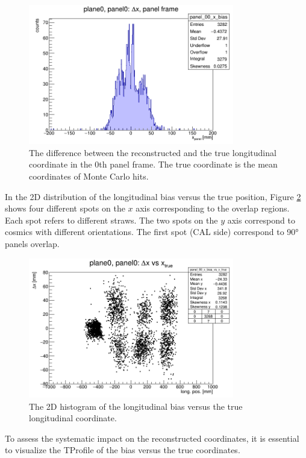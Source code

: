 \begin{figure}[!h]
    \centering
    \includegraphics[width=0.8\textwidth]{figures/png/panel_00_x_bias.png}
    \caption{The difference between the reconstructed and the true longitudinal coordinate in the 0th panel frame. 
    The true coordinate is the mean coordinates of Monte Carlo hits.}
    \label{fig:bias}
\end{figure}
In the 2D distribution of the longitudinal bias versus the true position, 
Figure \ref{fig:rec2D} shows four different spots on the $x$ axis corresponding to 
the overlap regions. Each spot refers to different straws. The two spots on the $y$ axis correspond to cosmics with different orientations. 
The first spot (CAL side) correspond to 90° panels overlap.
\begin{figure}[!h]
    \centering
    \includegraphics[width=0.8\textwidth]{figures/png/panel_00_x_bias_vs_x.png}
    \caption{The 2D histogram of the longitudinal bias versus the true longitudinal coordinate.}
    \label{fig:rec2D}
\end{figure}
To assess the systematic impact on the reconstructed coordinates, it is essential to visualize the TProfile of the bias versus the true coordinates. 
